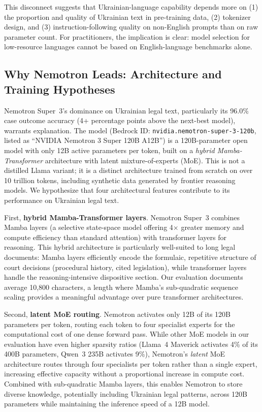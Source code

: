 \documentclass[11pt,a4paper]{article}
\begin{document}
This disconnect suggests that Ukrainian-language capability depends more on (1) the proportion and quality of Ukrainian text in pre-training data, (2) tokenizer design, and (3) instruction-following quality on non-English prompts than on raw parameter count. For practitioners, the implication is clear: model selection for low-resource languages cannot be based on English-language benchmarks alone.

\subsection{Why Nemotron Leads: Architecture and Training Hypotheses}

Nemotron Super~3's dominance on Ukrainian legal text, particularly its 96.0\% case outcome accuracy (4+ percentage points above the next-best model), warrants explanation. The model (Bedrock ID: \texttt{nvidia.nemotron-super-3-120b}, listed as ``NVIDIA Nemotron 3 Super 120B A12B'') is a 120B-parameter open model with only 12B active parameters per token, built on a \emph{hybrid Mamba-Transformer} architecture with latent mixture-of-experts (MoE). This is not a distilled Llama variant; it is a distinct architecture trained from scratch on over 10 trillion tokens, including synthetic data generated by frontier reasoning models. We hypothesize that four architectural features contribute to its performance on Ukrainian legal text.

First, \textbf{hybrid Mamba-Transformer layers}. Nemotron Super~3 combines Mamba layers (a selective state-space model offering 4$\times$ greater memory and compute efficiency than standard attention) with transformer layers for reasoning. This hybrid architecture is particularly well-suited to long legal documents: Mamba layers efficiently encode the formulaic, repetitive structure of court decisions (procedural history, cited legislation), while transformer layers handle the reasoning-intensive dispositive section. Our evaluation documents average 10,800 characters, a length where Mamba's sub-quadratic sequence scaling provides a meaningful advantage over pure transformer architectures.

Second, \textbf{latent MoE routing}. Nemotron activates only 12B of its 120B parameters per token, routing each token to four specialist experts for the computational cost of one dense forward pass. While other MoE models in our evaluation have even higher sparsity ratios (Llama~4 Maverick activates 4\% of its 400B parameters, Qwen~3 235B activates 9\%), Nemotron's \emph{latent} MoE architecture routes through four specialists per token rather than a single expert, increasing effective capacity without a proportional increase in compute cost. Combined with sub-quadratic Mamba layers, this enables Nemotron to store diverse knowledge, potentially including Ukrainian legal patterns, across 120B parameters while maintaining the inference speed of a 12B model.
\end{document}
